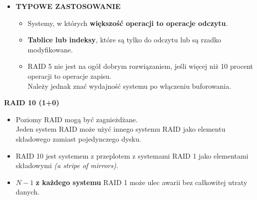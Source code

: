 \documentclass[a5paper,6pt]{article}
\begin{document}
\begin{itemize}
        \item \textbf{TYPOWE ZASTOSOWANIE}
        \begin{itemize}
            \item Systemy, w których
                  \textbf{większość operacji to operacje odczytu}.
            \item \textbf{Tablice lub indeksy}, które są tylko do odczytu lub
                  są rzadko modyfikowane.
            \item RAID 5 nie jest na ogół dobrym rozwiązaniem, jeśli więcej niż
                  10 procent operacji to operacje zapisu.\\
                  Należy jednak znać wydajność systemu po włączeniu buforowania.
        \end{itemize}
    \end{itemize}

    \textbf{RAID 10 (1+0)}
    \begin{itemize}
        \item Poziomy RAID mogą być zagnieżdżane.\\
              Jeden system RAID może użyć innego systemu RAID jako elementu
              składowego zamiast pojedynczego dysku.
        \item RAID 10 jest systemem z przeplotem z systemami RAID 1 jako
              elementami składowymi \textit{(a stripe of mirrors)}.
        \item $N - 1$ \textbf{z każdego systemu} RAID 1 może ulec awarii
              bez całkowitej utraty danych.
    \end{itemize}

    \begin{center}
    \end{center}
\end{document}
